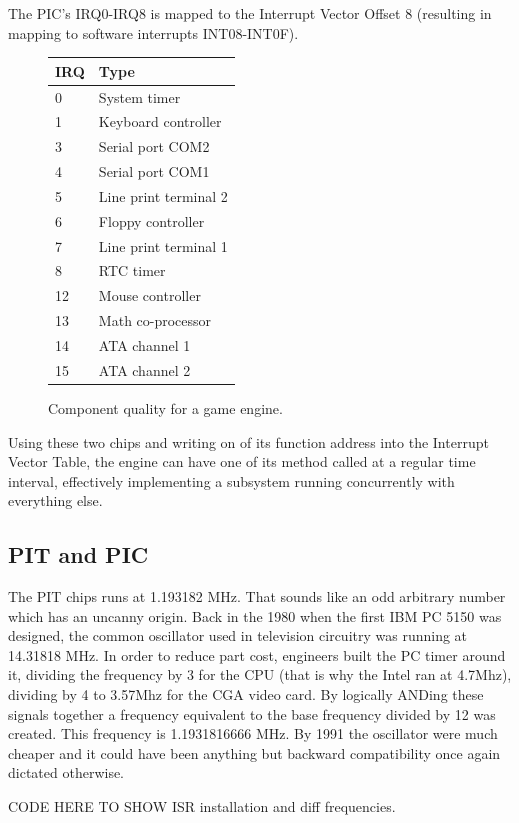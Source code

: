 The PIC's IRQ0-IRQ8 is mapped to the Interrupt Vector Offset 8 (resulting in mapping to software interrupts INT08-INT0F).\\

\par
\begin{figure}[H]
\centering
\begin{tabularx}{\textwidth}{ X X  }
  \toprule
  \textbf{IRQ} & \textbf{Type} \\ \bottomrule
0 & System timer \\
1 & Keyboard controller \\
3 & Serial port COM2 \\ 
4 & Serial port COM1 \\
5 & Line print terminal 2 \\
6 & Floppy controller \\
7 & Line print terminal 1 \\
8 & RTC timer \\
12 & Mouse controller \\
13 & Math co-processor \\
14 & ATA channel 1 \\
15 & ATA channel 2  \\
\bottomrule
\end{tabularx}
\caption{Component quality for a game engine.}
\end{figure}
Using these two chips and writing on of its function address into the Interrupt Vector Table, the engine can have one of its method called at a regular time interval, effectively implementing a subsystem running concurrently with everything else.\\



\subsection{PIT and PIC}
The PIT chips runs at 1.193182 MHz. That sounds like an odd arbitrary number which has an uncanny origin. Back in the 1980 when the first IBM PC 5150 was designed, the common oscillator used in television circuitry was running at 14.31818 MHz. In order to reduce part cost, engineers built the PC timer around it, dividing the frequency by 3 for the CPU (that is why the Intel ran at 4.7Mhz), dividing by 4 to 3.57Mhz for the CGA video card. By logically ANDing these signals together a frequency equivalent to the base frequency divided by 12 was created. This frequency is 1.1931816666 MHz. By 1991 the oscillator were much cheaper and it could have been anything but backward compatibility once again dictated otherwise.\\
\par
CODE HERE TO SHOW ISR installation and diff frequencies.



